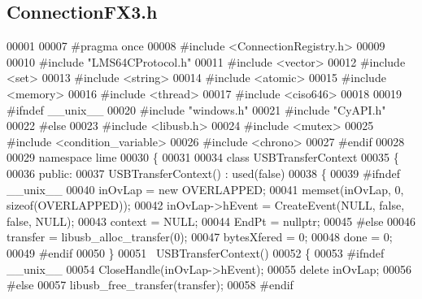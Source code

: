 \subsection{Connection\+F\+X3.\+h}
\label{ConnectionFX3_8h_source}

\begin{DoxyCode}
00001 
00007 \textcolor{preprocessor}{#pragma once}
00008 \textcolor{preprocessor}{#include <ConnectionRegistry.h>}
00009 
00010 \textcolor{preprocessor}{#include "LMS64CProtocol.h"}
00011 \textcolor{preprocessor}{#include <vector>}
00012 \textcolor{preprocessor}{#include <set>}
00013 \textcolor{preprocessor}{#include <string>}
00014 \textcolor{preprocessor}{#include <atomic>}
00015 \textcolor{preprocessor}{#include <memory>}
00016 \textcolor{preprocessor}{#include <thread>}
00017 \textcolor{preprocessor}{#include <ciso646>}
00018 
00019 \textcolor{preprocessor}{#ifndef \_\_unix\_\_}
00020 \textcolor{preprocessor}{#include "windows.h"}
00021 \textcolor{preprocessor}{#include "CyAPI.h"}
00022 \textcolor{preprocessor}{#else}
00023 \textcolor{preprocessor}{#include <libusb.h>}
00024 \textcolor{preprocessor}{#include <mutex>}
00025 \textcolor{preprocessor}{#include <condition\_variable>}
00026 \textcolor{preprocessor}{#include <chrono>}
00027 \textcolor{preprocessor}{#endif}
00028 
00029 \textcolor{keyword}{namespace }lime
00030 \{
00031 
00034 \textcolor{keyword}{class }USBTransferContext
00035 \{
00036 \textcolor{keyword}{public}:
00037     USBTransferContext() : used(false)
00038     \{
00039 \textcolor{preprocessor}{#ifndef \_\_unix\_\_}
00040         inOvLap = \textcolor{keyword}{new} OVERLAPPED;
00041         memset(inOvLap, 0, \textcolor{keyword}{sizeof}(OVERLAPPED));
00042         inOvLap->hEvent = CreateEvent(NULL, \textcolor{keyword}{false}, \textcolor{keyword}{false}, NULL);
00043         context = NULL;
00044         EndPt = \textcolor{keyword}{nullptr};
00045 \textcolor{preprocessor}{#else}
00046         transfer = libusb\_alloc\_transfer(0);
00047         bytesXfered = 0;
00048         done = 0;
00049 \textcolor{preprocessor}{#endif}
00050     \}
00051     ~USBTransferContext()
00052     \{
00053 \textcolor{preprocessor}{#ifndef \_\_unix\_\_}
00054         CloseHandle(inOvLap->hEvent);
00055         \textcolor{keyword}{delete} inOvLap;
00056 \textcolor{preprocessor}{#else}
00057         libusb\_free\_transfer(transfer);
00058 \textcolor{preprocessor}{#endif}

\end{DoxyCode}
